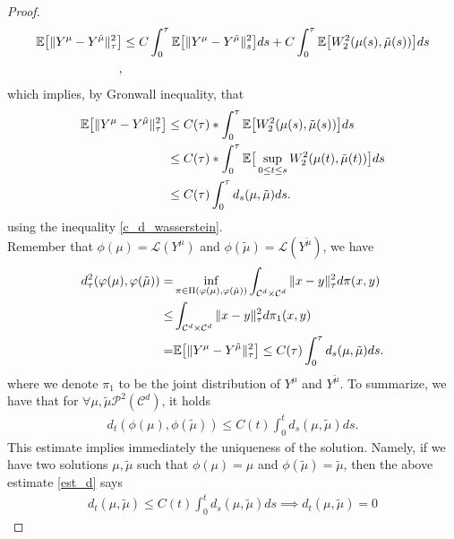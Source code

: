 \begin{proof}
 \begin{align*}
   \mathbb{E}\big[\|Y^{\mu } - Y^{\tilde{\mu } }\|_{\tau}^2\big] &\le C \int_0^{\tau } \mathbb{E}\big[\|Y^{\mu } - Y^{\tilde{\mu } }\|_s^2\big] ds + C \int_0^{\tau } \mathbb{E}\big[W_2^2(\mu(s),\tilde{\mu }(s) )\big]  ds  \\
 ,\end{align*}
 which implies, by Gronwall inequality, that
 \begin{align*}
   \mathbb{E}\big[\|Y^{\mu } - Y^{\tilde{\mu } }\|_{\tau}^2\big] &\le C(\tau )* \int_0^{\tau }  \mathbb{E}\big[W_2^2(\mu(s) ,\tilde{\mu }(s) )\big] ds \\                                               
                                                 &\le C(\tau )* \int_0^{\tau } \mathbb{E}\big[ \sup_{0\le t \le s} W_2^2(\mu(t) ,\tilde{\mu }(t) )\big] ds \\                                              
                                                 &\le C(\tau ) \int_0^{\tau } d_s(\mu ,\tilde{\mu } )ds
 .\end{align*}
 using  the inequality \autoref{c_d_wasserstein}.\\[1ex]
 Remember that $\phi(\mu) = \mathcal{L}(Y^{\mu } )$ and $\phi(\tilde{\mu } ) = \mathcal{L}(Y^{\tilde{\mu } } )$, we have
 \begin{align*}
   d_{\tau }^2(\varphi(\mu ),\varphi(\tilde{\mu } )) =&  \inf_{\pi  \in  \Pi(\varphi(\mu) ,\varphi(\tilde{\mu } ))} \int_{\mathcal{C}^{d} \times  \mathcal{C}^{d}   } \|x-y\|_\tau^2 d\pi(x,y)\\
   \leq &
\int_{\mathcal{C}^{d}\times\mathcal{C}^{d}  } \|x-y\|_{\tau }^{2} d\pi_1(x,y) \\
= & \mathbb{E}\big[\|Y^{\mu }-Y^{\tilde{\mu } } \|_\tau^2 \big] \le  C(\tau ) \int_0^{\tau } d_s(\mu ,\tilde{\mu } )ds
 .\end{align*} 
 where we denote  $\pi_1$ to be the joint distribution of $Y^{\mu } $ and $Y^{\tilde{\mu } }$.
 To summarize, we have that for $\forall  \mu , \tilde{\mu } \mathcal{P}^2(\mathcal{C}^{d} ) $, it holds
 \begin{align}\label{est_d}
   d_t(\phi(\mu ),\phi(\tilde{\mu } )) \le C(t) \int_0^{t} d_s(\mu ,\tilde{\mu } ) ds 
 .\end{align}
This estimate implies immediately the uniqueness of the solution. Namely, if we have two solutions $\mu ,\tilde{\mu } $ such that $  \phi(\mu ) = \mu $ and $ \phi(\tilde{\mu } ) = \tilde{\mu } $,
then the above estimate \autoref{est_d} says 
\begin{align*}
  d_t(\mu,\tilde{\mu } ) \le  C(t) \int_0^{t} d_s(\mu ,\tilde{\mu } )  ds \implies d_t(\mu ,\tilde{\mu } )  = 0

\end{align*}
\end{proof}
